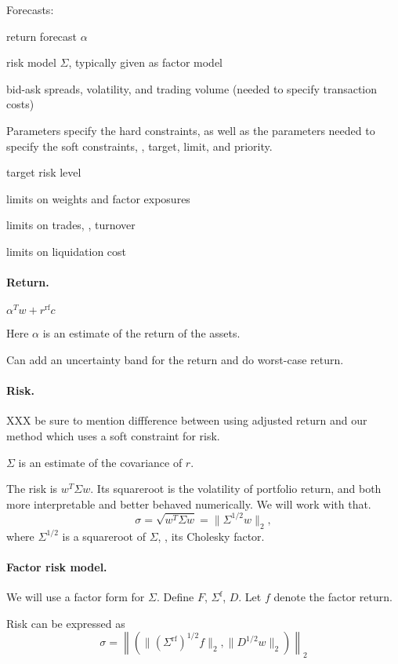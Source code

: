 \documentclass[12pt]{article}
\begin{document}
Forecasts:
\BIT
\item return forecast $\alpha$
\item risk model $\Sigma$, typically given as factor model
\item bid-ask spreads,
volatility, and trading volume (needed to specify transaction costs)
\EIT

Parameters specify the hard constraints, as well as the parameters
needed to specify the soft constraints, \ie, target, limit, and priority.
\BIT
\item target risk level
\item limits on weights and factor exposures
\item limits on trades, \eg, turnover
\item limits on liquidation cost
\EIT


\paragraph{Return.}

$\alpha^T w + r^\mathrm{rf} c$

Here $\alpha$ is an estimate of the return of the assets.

Can add an uncertainty band for the return and do worst-case return.

\paragraph{Risk.}
XXX be sure to mention diffference between using adjusted return 
and our method which uses a soft constraint for risk.

$\Sigma$ is an estimate of the covariance of $r$.

The risk is $w^T\Sigma w$.  Its squareroot is the volatility of portfolio return,
and both more interpretable and better behaved numerically.  We will work with
that.  
\[
\sigma = \sqrt{w^T \Sigma w} = \|\Sigma^{1/2}w \|_2,
\]
where $\Sigma^{1/2}$ is a squareroot of $\Sigma$, \eg, its Cholesky factor.

\paragraph{Factor risk model.}
We will use a factor form for $\Sigma$.  Define $F$, $\Sigma^\mathrm{f}$, $D$.
Let $f$ denote the factor return.

Risk can be expressed as 
\[
\sigma = \left\| (\| (\Sigma^\mathrm{rf})^{1/2} f \|_2, \|D^{1/2}w\|_2 ) \right\|_2
\]
\end{document}
